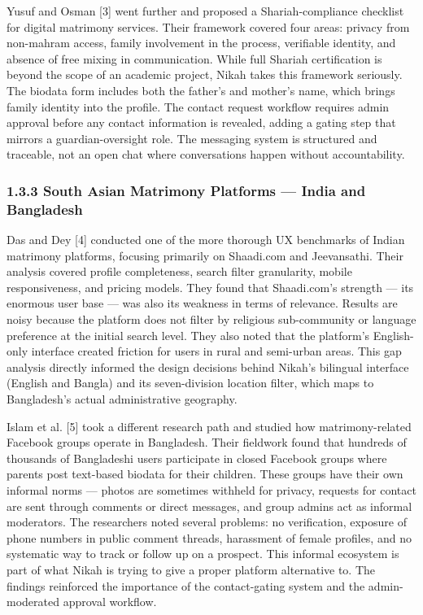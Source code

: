 \documentclass[conference]{IEEEtran}
\begin{document}
Yusuf and Osman [3] went further and proposed a Shariah-compliance checklist for digital matrimony services. Their framework covered four areas: privacy from non-mahram access, family involvement in the process, verifiable identity, and absence of free mixing in communication. While full Shariah certification is beyond the scope of an academic project, Nikah takes this framework seriously. The biodata form includes both the father's and mother's name, which brings family identity into the profile. The contact request workflow requires admin approval before any contact information is revealed, adding a gating step that mirrors a guardian-oversight role. The messaging system is structured and traceable, not an open chat where conversations happen without accountability.

\subsubsection*{1.3.3 South Asian Matrimony Platforms --- India and Bangladesh}
Das and Dey [4] conducted one of the more thorough UX benchmarks of Indian matrimony platforms, focusing primarily on Shaadi.com and Jeevansathi. Their analysis covered profile completeness, search filter granularity, mobile responsiveness, and pricing models. They found that Shaadi.com's strength --- its enormous user base --- was also its weakness in terms of relevance. Results are noisy because the platform does not filter by religious sub-community or language preference at the initial search level. They also noted that the platform's English-only interface created friction for users in rural and semi-urban areas. This gap analysis directly informed the design decisions behind Nikah's bilingual interface (English and Bangla) and its seven-division location filter, which maps to Bangladesh's actual administrative geography.

Islam et al. [5] took a different research path and studied how matrimony-related Facebook groups operate in Bangladesh. Their fieldwork found that hundreds of thousands of Bangladeshi users participate in closed Facebook groups where parents post text-based biodata for their children. These groups have their own informal norms --- photos are sometimes withheld for privacy, requests for contact are sent through comments or direct messages, and group admins act as informal moderators. The researchers noted several problems: no verification, exposure of phone numbers in public comment threads, harassment of female profiles, and no systematic way to track or follow up on a prospect. This informal ecosystem is part of what Nikah is trying to give a proper platform alternative to. The findings reinforced the importance of the contact-gating system and the admin-moderated approval workflow.
\end{document}
